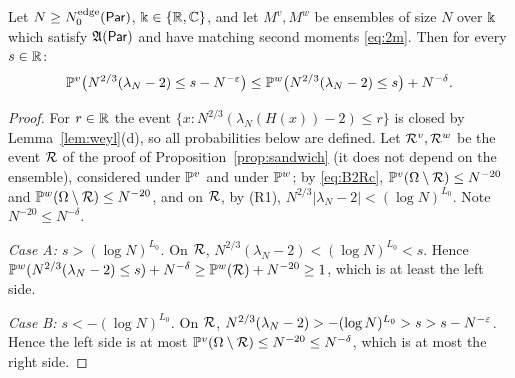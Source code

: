 \begin{proposition}\label{prop:oneside}
Let $N\ge N_0^{\rm edge}(\Par)$, $\K\in\{\R,\C\}$, and let $M^v,M^w$ be ensembles of size $N$ over $\K$ which satisfy $\fA(\Par)$ and have matching second moments
\eqref{eq:2m}. Then for every $s\in\R$:
\[
\P^v\big(N^{2/3}(\lambda_N-2)\le s-N^{-\e}\big)\le\P^w\big(N^{2/3}(\lambda_N-2)\le s\big)+N^{-\delta}.
\]
\end{proposition}
\begin{proof}
For $r\in\R$ the event $\{x:N^{2/3}(\lambda_N(H(x))-2)\le r\}$ is closed by Lemma~\ref{lem:weyl}(d), so all probabilities below are defined.
Let $\cR^v,\cR^w$ be the event $\cR$ of the proof of Proposition~\ref{prop:sandwich} (it does not depend on the ensemble), considered under $\P^v$ and under $\P^w$;
by \eqref{eq:B2Rc}, $\P^v(\Omega\setminus\cR)\le N^{-20}$ and $\P^w(\Omega\setminus\cR)\le N^{-20}$, and on $\cR$, by (R1), $N^{2/3}|\lambda_N-2|<(\log N)^{L_0}$.
Note $N^{-20}\le N^{-\delta}$.

\emph{Case A: $s>(\log N)^{L_0}$.} On $\cR$, $N^{2/3}(\lambda_N-2)<(\log N)^{L_0}<s$. Hence
$\P^w(N^{2/3}(\lambda_N-2)\le s)+N^{-\delta}\ge\P^w(\cR)+N^{-20}\ge1$, which is at least the left side.

\emph{Case B: $s<-(\log N)^{L_0}$.} On $\cR$, $N^{2/3}(\lambda_N-2)>-(\log N)^{L_0}>s>s-N^{-\e}$. Hence the left side is at most
$\P^v(\Omega\setminus\cR)\le N^{-20}\le N^{-\delta}$, which is at most the right side.


\end{proof}
